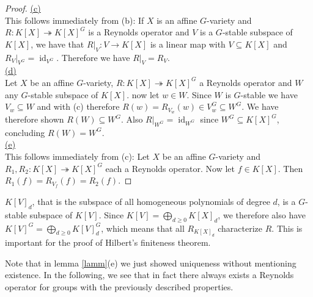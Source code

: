 \begin{proof}
  \underline{(c)}\\
  This follows immediately from (b):
  If $X$ is an affine $G$-variety and $R \colon K[X] \twoheadrightarrow K[X]^G$ is a Reynolds operator and $V$ is a $G$-stable subspace of $K[X]$, we have that $\left. R \right|_V \colon V \rightarrow K[X]$ is a linear map with $V \subseteq K[X]$ and $\left. R_V \right|_{V^G} = \operatorname{id}_{V^G}$.
  Therefore we have $\left. R \right|_V = R_V$.  \\
  \underline{(d)}\\
  Let $X$ be an affine $G$-variety, $R \colon K[X] \twoheadrightarrow K[X]^G$ a Reynolds operator and $W$ any $G$-stable subspace of $K[X]$.
  now let $w \in W$.
  Since $W$ is $G$-stable we have $V_w \subseteq W$ and with (c) therefore $R(w) = R_{V_w} (w) \in V_w^G \subseteq W^G$.
  We have therefore shown $R(W) \subseteq W^G$.
  Also $\left. R \right|_{W^G} = \operatorname{id}_{W^G}$ since $W^G \subseteq K[X]^G$, concluding $R(W) = W^G$.  \\
  \underline{(e)}\\
  This follows immediately from (c):
  Let $X$ be an affine $G$-variety and $R_1,R_2 \colon K[X] \twoheadrightarrow K[X]^G$ each a Reynolds operator.
  Now let $f \in K[X]$.
  Then $R_1(f) = R_{V_f} (f) = R_2 (f)$.
\end{proof}

\begin{remark}
  $K[V]_d$, that is the subspace of all homogeneous polynomials of degree $d$, is a $G$-stable subspace of $K[V]$.
  Since $K[V] = \bigoplus_{d \geq 0} K[X]_d$, we therefore also have $K[V]^G = \bigoplus_{d \geq 0} K[V]_d^G$, which means that all $R_{K[X]_d}$ characterize $R$.
  This is important for the proof of Hilbert's finiteness theorem.
\end{remark}

\begin{remark}
  Note that in lemma \ref{lamm}(e) we just showed uniqueness without mentioning existence.
  In the following, we see that in fact there always exists a Reynolds operator for groups with the previously described properties.
\end{remark}


